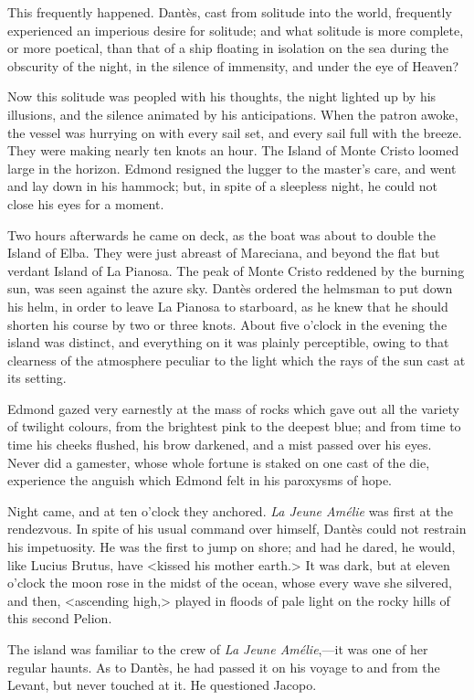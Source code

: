  This frequently happened. Dantès, cast from solitude into the world, frequently experienced an imperious desire for solitude; and what solitude is more complete, or more poetical, than that of a ship floating in isolation on the sea during the obscurity of the night, in the silence of immensity, and under the eye of Heaven? 

 Now this solitude was peopled with his thoughts, the night lighted up by his illusions, and the silence animated by his anticipations. When the patron awoke, the vessel was hurrying on with every sail set, and every sail full with the breeze. They were making nearly ten knots an hour. The Island of Monte Cristo loomed large in the horizon. Edmond resigned the lugger to the master's care, and went and lay down in his hammock; but, in spite of a sleepless night, he could not close his eyes for a moment. 

 Two hours afterwards he came on deck, as the boat was about to double the Island of Elba. They were just abreast of Mareciana, and beyond the flat but verdant Island of La Pianosa. The peak of Monte Cristo reddened by the burning sun, was seen against the azure sky. Dantès ordered the helmsman to put down his helm, in order to leave La Pianosa to starboard, as he knew that he should shorten his course by two or three knots. About five o'clock in the evening the island was distinct, and everything on it was plainly perceptible, owing to that clearness of the atmosphere peculiar to the light which the rays of the sun cast at its setting. 

 Edmond gazed very earnestly at the mass of rocks which gave out all the variety of twilight colours, from the brightest pink to the deepest blue; and from time to time his cheeks flushed, his brow darkened, and a mist passed over his eyes. Never did a gamester, whose whole fortune is staked on one cast of the die, experience the anguish which Edmond felt in his paroxysms of hope. 

 Night came, and at ten o'clock they anchored. \textit{La Jeune Amélie} was first at the rendezvous. In spite of his usual command over himself, Dantès could not restrain his impetuosity. He was the first to jump on shore; and had he dared, he would, like Lucius Brutus, have <kissed his mother earth.> It was dark, but at eleven o'clock the moon rose in the midst of the ocean, whose every wave she silvered, and then, <ascending high,> played in floods of pale light on the rocky hills of this second Pelion. 

 The island was familiar to the crew of \textit{La Jeune Amélie},—it was one of her regular haunts. As to Dantès, he had passed it on his voyage to and from the Levant, but never touched at it. He questioned Jacopo. 

